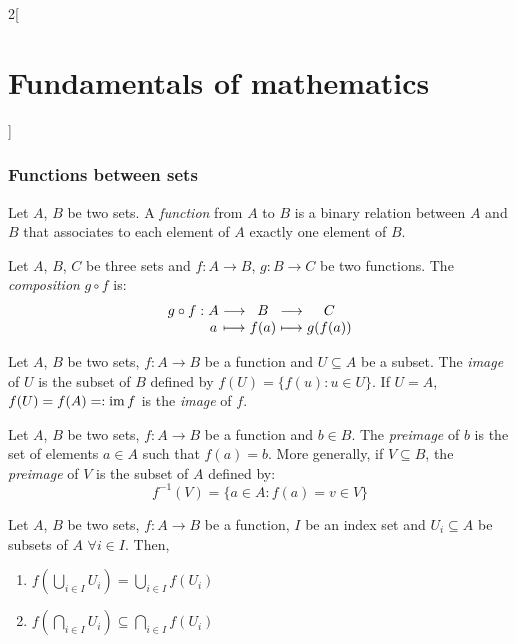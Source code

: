 \documentclass[../../../main_math.tex]{subfiles}
\begin{document}
\begin{multicols}{2}[\section{Fundamentals of mathematics}]
  \subsubsection{Functions between sets}
  \begin{definition}
    Let $A$, $B$ be two sets. A \emph{function} from $A$ to $B$ is a binary relation between $A$ and $B$ that associates to each element of $A$ exactly one element of $B$.
  \end{definition}
  \begin{definition}
    Let $A$, $B$, $C$ be three sets and $f:A\rightarrow B$, $g:B\rightarrow C$ be two functions. The \emph{composition} $g\circ f$ is:
    $$\begin{array}{r@{\hspace{0.5\tabcolsep}}c@{\hspace{0.5\tabcolsep}}c@{\hspace{0.5\tabcolsep}}c@{\hspace{0.5\tabcolsep}}c@{\hspace{0.5\tabcolsep}}c}
        g\circ f: & A & \longrightarrow & B    & \longrightarrow & C       \\
                  & a & \longmapsto     & f(a) & \longmapsto     & g(f(a))
      \end{array}$$
  \end{definition}
  \begin{definition}
    Let $A$, $B$ be two sets, $f:A\rightarrow B$ be a function and $U\subseteq A$ be a subset. The \emph{image} of $U$ is the subset of $B$ defined by $f(U)=\{f(u): u\in U\}$. If $U=A$, $f(U)=f(A)=:\operatorname{im} f$ is the \emph{image} of $f$.
  \end{definition}
  \begin{definition}
    Let $A$, $B$ be two sets, $f:A\rightarrow B$ be a function and $b\in B$. The \emph{preimage} of $b$ is the set of elements $a\in A$ such that $f(a)=b$. More generally, if $V\subseteq B$, the \emph{preimage} of $V$ is the subset of $A$ defined by: $$f^{-1}(V)=\{a\in A: f(a)=v\in V\}$$
  \end{definition}
  \begin{proposition}
    Let $A$, $B$ be two sets, $f:A\rightarrow B$ be a function, $I$ be an index set and $U_i\subseteq A$ be subsets of $A$ $\forall i\in I$. Then,
    \begin{enumerate}
      \item $f\left(\bigcup_{i\in I}U_i\right)=\bigcup_{i\in I}f(U_i)$
      \item $f\left(\bigcap_{i\in I}U_i\right)\subseteq\bigcap_{i\in I}f(U_i)$

\end{enumerate}
\end{proposition}
\end{multicols}
\end{document}
